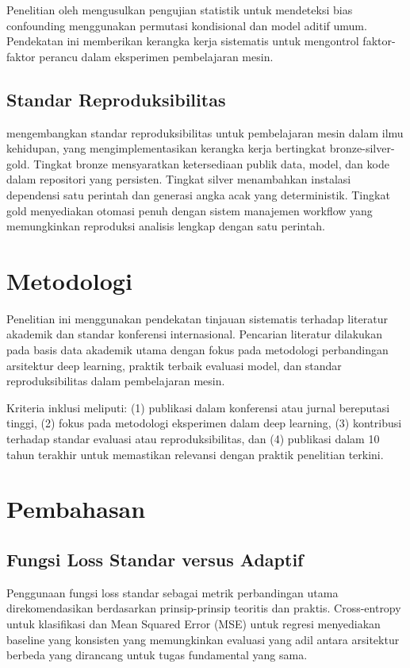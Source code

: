 \documentclass[12pt,a4paper]{article}
\begin{document}
Penelitian oleh \citet{patil2022statistical} mengusulkan pengujian statistik untuk mendeteksi bias confounding menggunakan permutasi kondisional dan model aditif umum. Pendekatan ini memberikan kerangka kerja sistematis untuk mengontrol faktor-faktor perancu dalam eksperimen pembelajaran mesin.

\subsection{Standar Reproduksibilitas}

\citet{pineau2021improving} mengembangkan standar reproduksibilitas untuk pembelajaran mesin dalam ilmu kehidupan, yang mengimplementasikan kerangka kerja bertingkat bronze-silver-gold. Tingkat bronze mensyaratkan ketersediaan publik data, model, dan kode dalam repositori yang persisten. Tingkat silver menambahkan instalasi dependensi satu perintah dan generasi angka acak yang deterministik. Tingkat gold menyediakan otomasi penuh dengan sistem manajemen workflow yang memungkinkan reproduksi analisis lengkap dengan satu perintah.

\section{Metodologi}

Penelitian ini menggunakan pendekatan tinjauan sistematis terhadap literatur akademik dan standar konferensi internasional. Pencarian literatur dilakukan pada basis data akademik utama dengan fokus pada metodologi perbandingan arsitektur deep learning, praktik terbaik evaluasi model, dan standar reproduksibilitas dalam pembelajaran mesin.

Kriteria inklusi meliputi: (1) publikasi dalam konferensi atau jurnal bereputasi tinggi, (2) fokus pada metodologi eksperimen dalam deep learning, (3) kontribusi terhadap standar evaluasi atau reproduksibilitas, dan (4) publikasi dalam 10 tahun terakhir untuk memastikan relevansi dengan praktik penelitian terkini.

\section{Pembahasan}

\subsection{Fungsi Loss Standar versus Adaptif}

Penggunaan fungsi loss standar sebagai metrik perbandingan utama direkomendasikan berdasarkan prinsip-prinsip teoritis dan praktis. Cross-entropy untuk klasifikasi dan Mean Squared Error (MSE) untuk regresi menyediakan baseline yang konsisten yang memungkinkan evaluasi yang adil antara arsitektur berbeda yang dirancang untuk tugas fundamental yang sama.
\end{document}
